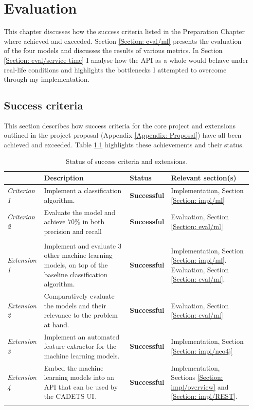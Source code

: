
	\chapter{Evaluation}
	This chapter discusses how the success criteria listed in the Preparation Chapter where achieved and exceeded.  Section \ref{Section: eval/ml} presents the evaluation of the four models and discusses the results of various metrics. In Section \ref{Section: eval/service-time} I analyse how the API as a whole would behave under real-life conditions and highlights the bottlenecks I attempted to overcome through my implementation.
	\section{Success criteria} \label{Section: eval/success-criteria}
		This section describes how success criteria for the core project and extensions outlined in the project proposal (Appendix \ref{Appendix: Proposal}) have all been achieved and exceeded. Table \ref{Table: eval/success/status} highlights these achievements and their status. 
		\begin{longtable}{|p{}|p{}|p{}|p{}|}
			\hline
			& \textbf{Description} & \textbf{Status} & \textbf{Relevant section(s)} \\
			\hline
			\textit{Criterion 1} & Implement a classification algorithm. & \textbf{Successful} & Implementation, Section \ref{Section: impl/ml} \\
			\hline
			\textit{Criterion 2} & Evaluate the model and achieve $70\%$ in both precision and recall & \textbf{Successful} & Evaluation, Section \ref{Section: eval/ml} \\
			\hhline{====}
			\multicolumn{4}{|c|}{\textbf{Extensions}} \\
			\hhline{====}
			\textit{Extension 1} & Implement and evaluate 3 other machine learning models, on top of the baseline classification algorithm. & \textbf{Successful} & Implementation, Section \ref{Section: impl/ml}. Evaluation, Section \ref{Section: eval/ml}.\\
			\hline
			\textit{Extension 2} & Comparatively evaluate the models and their relevance to the problem at hand. & \textbf{Successful} & Evaluation, Section \ref{Section: eval/ml} \\
			\hline
			\textit{Extension 3} & Implement an automated feature extractor for the machine learning models. & \textbf{Successful} & Implementation, Section \ref{Section: impl/neo4j} \\
			\hline
			\textit{Extension 4} & Embed the machine learning models into an API that can be used by the CADETS UI. & \textbf{Successful} & Implementation, Sections \ref{Section: impl/overview} and \ref{Section: impl/REST}. \\
			\hline
			\caption{Status of success criteria and extensions.}
			\label{Table: eval/success/status}
		\end{longtable}
		
